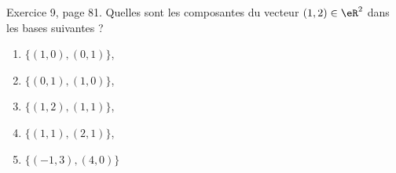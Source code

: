 \begin{exercice}\label{exoLineraire0020}

	Exercice 9, page 81. Quelles sont les composantes du vecteur $(1,2)\in\eR^2$ dans les bases suivantes ?
	\begin{enumerate}

		\item
			$\{ (1,0),(0,1) \}$,
		\item
			$\{ (0,1),(1,0) \}$,
		\item
			$\{ (1,2),(1,1) \}$,
		\item
			$\{ (1,1),(2,1) \}$,
		\item
			$\{ (-1,3),(4,0) \}$

	\end{enumerate}

\end{exercice}
